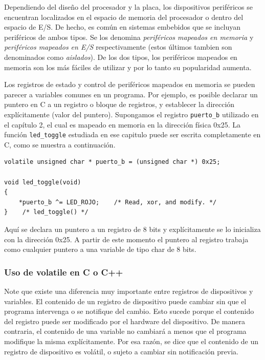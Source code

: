 \documentclass[output=paper, 
colorlinks,
citecolor=brown,
newtxmath
]{langscibook}
\begin{document}
Dependiendo del diseño del procesador y la placa, los dispositivos periféricos
se encuentran localizados en el espacio de memoria del procesador o dentro
del espacio de E/S. De hecho, es común en sistemas embebidos que se incluyan
periféricos de ambos tipos. Se los denomina \textit{periféricos mapeados en memoria}
y \textit{periféricos mapeados en E/S} respectivamente (estos últimos tambien son 
denominados como \textit{aislados}). De los dos tipos, los periféricos
mapeados en memoria son los más fáciles de utilizar y por lo tanto su popularidad
aumenta.

Los registros de estado y control de periféricos mapeados en memoria se pueden
parecer a variables comunes en un programa. Por ejemplo, es posible 
declarar un puntero en C a un registro o bloque de registros, 
y establecer
la dirección explícitamente (valor del puntero). Supongamos el registro
\texttt{puerto\_b} utilizado en el capítulo 2, el cual es mapeado en memoria en la dirección 
física 0x25. La función \texttt{led\_toggle} estudiada en ese capitulo puede ser 
escrita completamente en C, como se muestra a continuación.

\begin{verbatim}
volatile unsigned char * puerto_b = (unsigned char *) 0x25;

void led_toggle(void)
{
    *puerto_b ^= LED_ROJO;    /* Read, xor, and modify. */
}    /* led_toggle() */
\end{verbatim}

Aquí se declara un puntero a un registro de 8 bits y explícitamente se lo
inicializa con  la dirección 0x25. A partir de este momento el puntero al 
registro
trabaja como cualquier puntero a una variable de tipo char de 8 bits.


\subsubsection {Uso de volatile en C o C++}

Note que existe una diferencia muy importante entre 
registros de dispositivos y variables. El contenido de un registro
de dispositivo puede cambiar sin que el programa intervenga o se notifique
del cambio. Esto sucede porque el contenido del registro puede ser modificado
por el hardware del dispositivo. De manera contraria, el contenido de una
variable no cambiará a menos que el programa modifique la misma explícitamente.
Por esa razón, se dice que el contenido de un registro de dispositivo
es volátil, o sujeto a cambiar sin notificación previa.
\end{document}
